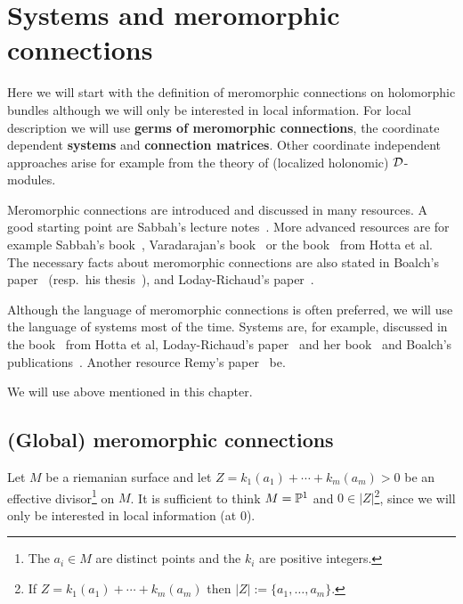 \chapter{Systems and meromorphic connections}
Here we will start with the definition of meromorphic connections on holomorphic
bundles although we will only be interested in local information.
For local description we will use \textbf{germs of meromorphic connections}, the
coordinate dependent \textbf{systems} and \textbf{connection matrices}.
Other coordinate independent approaches arise for example from the theory of
(localized holonomic) $\cD$-modules.

Meromorphic connections are introduced and discussed in many resources.
A good starting point are Sabbah's lecture notes~\cite{sabbah_cimpa90}.
More advanced resources are for example
Sabbah's book~\cite{sabbah2007isomonodromic},
Varadarajan's book~\cite{Varadarajan96linearmeromorphic} or the
book~\cite{hotta2008} from Hotta et al.
The necessary facts about meromorphic connections are also stated in
Boalch's paper~\cite{boalch} (resp.\ his thesis~\cite{thboalch}),
and Loday-Richaud's paper~\cite{Loday1994}.

Although the language of meromorphic connections is often preferred, we will
use the language of systems most of the time.
Systems are, for example, discussed in the book~\cite{hotta2008} from Hotta et
al, Loday-Richaud's paper~\cite{Loday1994} and her book~\cite{Loday2014} and
Boalch's publications~\cite{boalch,thboalch}. Another resource 
Remy's paper~\cite{Remy2014} be.

We will use  above mentioned  in this
chapter.

\section{(Global) meromorphic connections}
Let $M$ be a riemanian surface and let $Z=k_1(a_1)+\cdots+k_m(a_m)>0$ be an
effective divisor\footnote{The $a_i\in M$ are distinct points and the $k_i$ are
positive integers.} on $M$.
It is sufficient to think $M=\P^1$ and $0\in|Z|$\footnote{If
$Z=k_1(a_1)+\cdots+k_m(a_m)$ then $|Z|:=\{a_1,\dots,a_m\}$.}, since we will
only be interested in local information (at $0$).

